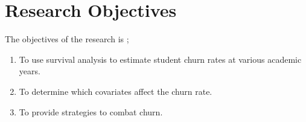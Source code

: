\documentclass[doublespacing,12pt]{report}
\begin{document}
\section{Research Objectives}
The objectives of the research is ;
\begin{enumerate}
\item To use survival analysis to estimate student churn rates at various academic years.
\item To determine which covariates affect the churn rate.
\item To provide strategies to combat churn.
\end{enumerate}
%	

\end{document}

